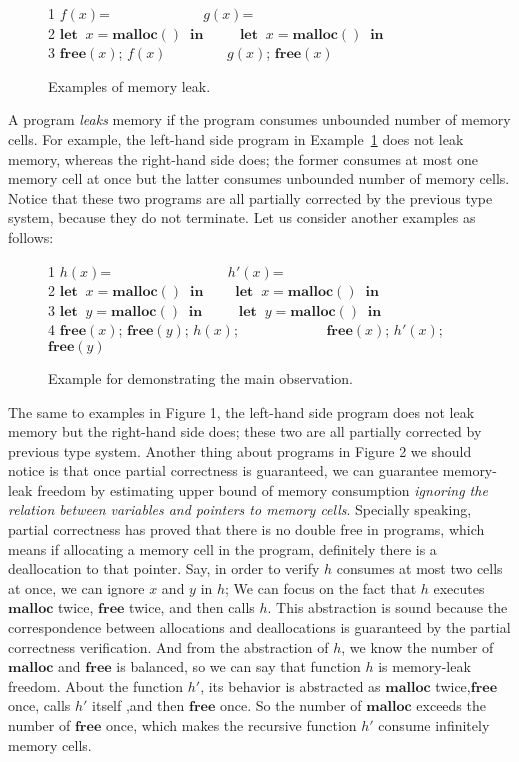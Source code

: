 \documentclass[english]{jssst_ppl} %
\newcommand\LET{\mathbf{let}\;}
\newcommand\IN{\mathbf{in}\;}
\newcommand\MALLOC{\mathbf{malloc()}\;}
\newcommand\Malloc{\mathbf{malloc}}
\newcommand\Free{\mathbf{free}}
\newcommand\Cirx{(x)}
\newcommand\dtb{\;\;\ \;\;\ \;\;\ \;\;\  }
\begin{document}
\begin{figure}[h]
1 \;\; $f(x)$= \dtb\dtb \dtb \;\;\;\; \;\;$g(x)$= \\
2 \;\; $\LET \; x = \MALLOC  \; \IN$ \;\dtb \;\;\;\;$\LET \; x = \MALLOC  \; \IN$\\
3 \;\; $\Free\Cirx$; \; $f(x)$\dtb\dtb\;\;\; \;\;$g(x)$; \; $\Free\Cirx$
\caption{Examples of memory leak.}
\label{example:memoryLeak}
\end{figure}

A program \emph{leaks} memory if the program consumes unbounded number of memory cells. For example, the left-hand side program in Example~\ref{example:memoryLeak} does not leak memory, whereas the right-hand side does; the former consumes at most one memory cell at once but the latter consumes unbounded number of memory cells. Notice that these two programs are all partially corrected by the previous type system, because they do not terminate. Let us consider another examples as follows:
\begin{figure}[h]
1 \;\; $h(x)$= \dtb\dtb\dtb\dtb $h'(x)$=\\
2 \;\; $\LET \; x = \MALLOC  \; \IN$\dtb $\LET \; x = \MALLOC \; \IN$ \\
3 \;\; $\LET \; y = \MALLOC  \; \IN$ \dtb $\LET \; y = \MALLOC \; \IN$\\
4 \;\; $\Free\Cirx$; \; $\Free(y) $; \; $h(x)$;  \dtb\dtb\dtb$\Free(x)$; $h'(x)$; $\Free(y)$
\caption{Example for demonstrating the main observation.}
\label{example:observation}
\end{figure}
The same to examples in Figure 1, the left-hand side program does not leak memory but the right-hand side does; these two are all partially corrected by previous type system. Another thing about programs in Figure 2 we should notice is that once partial correctness is guaranteed, we can guarantee memory-leak freedom by estimating upper bound of memory consumption \emph{ignoring the relation between variables and pointers to memory cells}. Specially speaking, partial correctness has proved that there is no double free in programs, which means if allocating a memory cell in the program, definitely there is a deallocation to that pointer. Say, in order to verify $h$ consumes at most two cells at once, we can ignore $x$ and $y$ in $h$; We can focus on the fact that $h$ executes $\Malloc$ twice, $\Free$ twice, and then calls $h$. This abstraction is sound because the correspondence between allocations and deallocations is guaranteed by the partial correctness verification. And from the abstraction of $h$, we know the number of $\Malloc$ and $\Free$ is balanced, so we can say that function $h$ is memory-leak freedom. About the function $h'$, its behavior is abstracted as $\Malloc$ twice,$\Free$ once, calls $h'$ itself ,and then $\Free$ once. So the number of $\Malloc$ exceeds the number of $\Free$ once, which makes the recursive function $h'$ consume infinitely memory cells.
\end{document}
